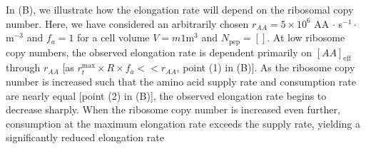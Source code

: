 In (B), we illustrate how the elongation rate will depend
on the ribosomal copy number. Here, we have considered
an arbitrarily chosen $r_{AA} = 5\times 10^6$ AA $\cdot$ s$^{-1} \cdot$ \textmu
m$^{-3}$ and $f_a = 1$ for a cell volume $V =m 1$\textmu m$^3$ and $N_\text{pep}
= []$. At low ribosome copy numbers, the observed elongation rate is dependent
primarily on $[AA]_\text{eff}$ through $r_{AA}$ [as $r_t^{\text{max}} \times R
\times f_a << r_{AA}$, point (1) in (B)]. As the
ribosome copy number is increased such that the amino acid supply rate and
consumption rate are nearly equal [point (2) in (B)],
the observed elongation rate begins to decrease sharply. When the ribosome copy
number is increased even further, consumption at the maximum elongation rate
exceeds the supply rate, yielding a significantly reduced elongation rate
